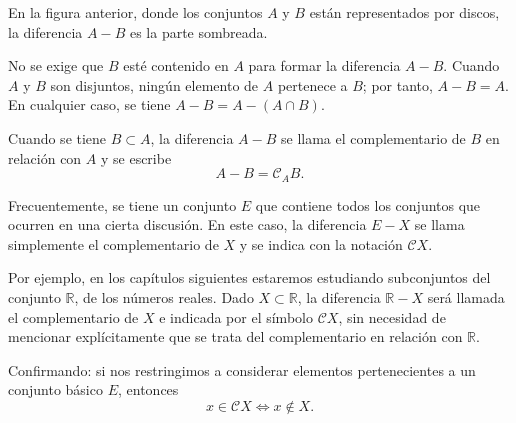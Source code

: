 \documentclass[12pt,oneside]{book}
\begin{document}
\begin{center}
\end{center}

En la figura anterior, donde los conjuntos \(A\) y \(B\) están representados por discos, la diferencia \(A - B\) es la parte sombreada.

No se exige que \(B\) esté contenido en \(A\) para formar la diferencia \(A - B\). Cuando \(A\) y \(B\) son disjuntos, ningún elemento de \(A\) pertenece a \(B\); por tanto, \(A - B = A\). En cualquier caso, se tiene \(A - B = A - (A \cap B)\).

Cuando se tiene \(B \subset A\), la diferencia \(A - B\) se llama el complementario de \(B\) en relación con \(A\) y se escribe
\[
A - B = \mathcal{C}_A B.
\]

Frecuentemente, se tiene un conjunto \(E\) que contiene todos los conjuntos que ocurren en una cierta discusión. En este caso, la diferencia \(E - X\) se llama simplemente el complementario de \(X\) y se indica con la notación \(\mathcal{C}X\).

Por ejemplo, en los capítulos siguientes estaremos estudiando subconjuntos del conjunto \(\mathbb{R}\), de los números reales. Dado \(X \subset \mathbb{R}\), la diferencia \(\mathbb{R} - X\) será llamada el complementario de \(X\) e indicada por el símbolo \(\mathcal{C}X\), sin necesidad de mencionar explícitamente que se trata del complementario en relación con \(\mathbb{R}\).

Confirmando: si nos restringimos a considerar elementos pertenecientes a un conjunto básico \(E\), entonces
\[
x \in \mathcal{C}X \iff x \notin X.
\]
\end{document}
